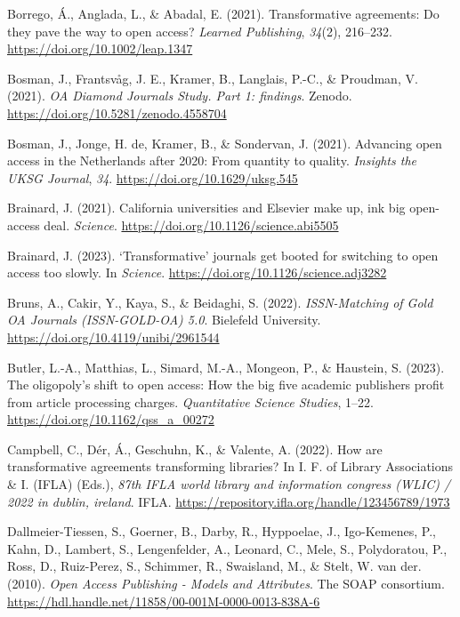 \documentclass[a4paper,man,floatsintext,longtable,noextraspace,12pt]{apa6}
\newenvironment{CSLReferences}%
  {}%
  {\par}
\begin{document}
\begin{CSLReferences}{1}{0}
\leavevmode{}%
Borrego, Á., Anglada, L., \& Abadal, E. (2021). Transformative
agreements: Do they pave the way to open access? \emph{Learned
Publishing}, \emph{34}(2), 216--232.
\url{https://doi.org/10.1002/leap.1347}

\leavevmode{}%
Bosman, J., Frantsvåg, J. E., Kramer, B., Langlais, P.-C., \& Proudman,
V. (2021). \emph{{OA Diamond Journals Study}. Part 1: findings}. Zenodo.
\url{https://doi.org/10.5281/zenodo.4558704}

\leavevmode{}%
Bosman, J., Jonge, H. de, Kramer, B., \& Sondervan, J. (2021). Advancing
open access in the {Netherlands} after 2020: From quantity to quality.
\emph{Insights the UKSG Journal}, \emph{34}.
\url{https://doi.org/10.1629/uksg.545}

\leavevmode{}%
Brainard, J. (2021). California universities and {Elsevier} make up, ink
big open-access deal. \emph{Science}.
\url{https://doi.org/10.1126/science.abi5505}

\leavevmode{}%
Brainard, J. (2023). {`Transformative'} journals get booted for
switching to open access too slowly. In \emph{Science}.
\url{https://doi.org/10.1126/science.adj3282}

\leavevmode{}%
Bruns, A., Cakir, Y., Kaya, S., \& Beidaghi, S. (2022).
\emph{{ISSN-Matching of Gold OA Journals (ISSN-GOLD-OA) 5.0}}. Bielefeld
University. \url{https://doi.org/10.4119/unibi/2961544}

\leavevmode{}%
Butler, L.-A., Matthias, L., Simard, M.-A., Mongeon, P., \& Haustein, S.
(2023). The oligopoly's shift to open access: How the big five academic
publishers profit from article processing charges. \emph{Quantitative
Science Studies}, 1--22. \url{https://doi.org/10.1162/qss_a_00272}

\leavevmode{}%
Campbell, C., Dér, Á., Geschuhn, K., \& Valente, A. (2022). How are
transformative agreements transforming libraries? In I. F. of Library
Associations \& I. (IFLA) (Eds.), \emph{87th IFLA world library and
information congress (WLIC) / 2022 in dublin, ireland}. IFLA.
\url{https://repository.ifla.org/handle/123456789/1973}

\leavevmode{}%
Dallmeier-Tiessen, S., Goerner, B., Darby, R., Hyppoelae, J.,
Igo-Kemenes, P., Kahn, D., Lambert, S., Lengenfelder, A., Leonard, C.,
Mele, S., Polydoratou, P., Ross, D., Ruiz-Perez, S., Schimmer, R.,
Swaisland, M., \& Stelt, W. van der. (2010). \emph{{Open Access
Publishing - Models and Attributes}}. The SOAP consortium.
\url{https://hdl.handle.net/11858/00-001M-0000-0013-838A-6}


\end{CSLReferences}
\end{document}
